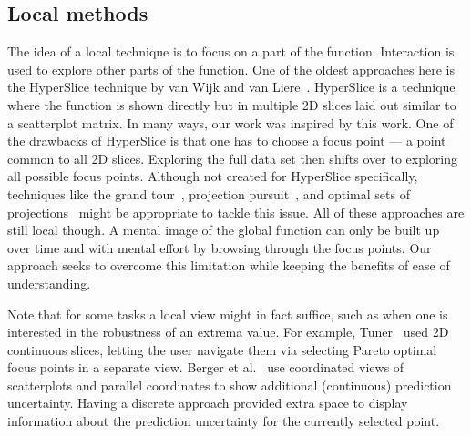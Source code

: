 
\subsection{Local methods}

The idea of a local technique is to focus on a part of the function.
Interaction is used to explore other parts of the function. One of the oldest
approaches here is the HyperSlice technique by van Wijk and van
Liere~\cite{Wijk:1993}.  HyperSlice is a technique where the function is shown
directly but in multiple 2D slices laid out similar to a scatterplot matrix. In
many ways, our work was inspired by this work. One of the drawbacks of
HyperSlice is that one has to choose a focus point --- a point common to all 2D
slices. Exploring the full data set then shifts over to exploring all possible
focus points. Although not created for HyperSlice specifically,  techniques
like the grand tour~\cite{Asimov:1985}, projection pursuit~\cite{Huber:1985},
and optimal sets of projections~\cite{Lehmann:2015b} might be appropriate to
tackle this issue.
All of these approaches are
still local though. A mental image of the global function can only be built up
over time and with mental effort by browsing through the focus points. Our
approach seeks to overcome this limitation while keeping the benefits of ease
of understanding.  

Note that for some tasks a local view might in fact suffice, such as when one is interested in the robustness of an extrema value. 
For example, Tuner~\cite{Torsney-Weir:2011} used 2D
continuous slices, letting the user navigate them via selecting Pareto optimal focus points in a separate view. 
Berger et
al.~\cite{Berger:2011} use coordinated views of
scatterplots and parallel coordinates to show additional (continuous) prediction uncertainty. Having a discrete approach provided extra space to display information about the prediction uncertainty for the currently selected point.

